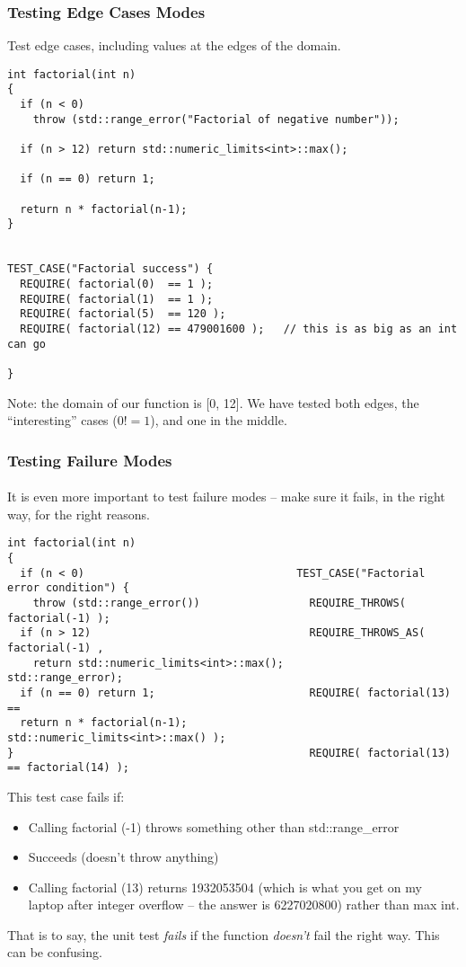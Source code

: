 \begin{frame}[fragile,t]
\frametitle{Testing Edge Cases Modes}
Test edge cases, including values at the edges of the domain.
{\scriptsize\begin{verbatim}
int factorial(int n)
{
  if (n < 0)
    throw (std::range_error("Factorial of negative number"));

  if (n > 12) return std::numeric_limits<int>::max();

  if (n == 0) return 1;

  return n * factorial(n-1);
}


TEST_CASE("Factorial success") {
  REQUIRE( factorial(0)  == 1 );
  REQUIRE( factorial(1)  == 1 );
  REQUIRE( factorial(5)  == 120 );
  REQUIRE( factorial(12) == 479001600 );   // this is as big as an int can go

}
\end{verbatim}}

Note: the domain of our function is [0, 12].  We have tested both
edges, the ``interesting'' cases ($0! = 1$), and one in the middle.

\end{frame}
\begin{frame}[fragile,t]
\frametitle{Testing Failure Modes}
\framesubtitle{}
It is even more important to test failure modes -- make sure it fails,
in the right way, for the right reasons.
{\scriptsize\begin{verbatim}
int factorial(int n)
{
  if (n < 0)                                 TEST_CASE("Factorial error condition") {    
    throw (std::range_error())                 REQUIRE_THROWS(    factorial(-1) );          
  if (n > 12)                                  REQUIRE_THROWS_AS( factorial(-1) ,        
    return std::numeric_limits<int>::max();                       std::range_error);                    
  if (n == 0) return 1;                        REQUIRE( factorial(13) ==                 
  return n * factorial(n-1);                         std::numeric_limits<int>::max() );  
}                                              REQUIRE( factorial(13) == factorial(14) );
\end{verbatim}}

This test case fails if:
\begin{itemize}
  \item Calling factorial (-1) throws something other than std::range\_error 
  \item Succeeds (doesn't throw anything) 
  \item Calling factorial (13) returns 1932053504 (which is what you get on my laptop after integer overflow -- 
  the answer is 6227020800) rather than max int.
\end{itemize}

That is to say, the unit test \emph{fails} if the function \emph{doesn't} fail the right way.  This can be confusing.

\end{frame}


